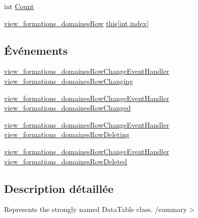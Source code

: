 \begin{DoxyCompactItemize}
\item 
int \hyperlink{classforma_1_1formadb_data_set_1_1view__formations__domaines_data_table_ae6dece4888a8569a5f2888d2f34e77d6}{Count}
\item 
\hyperlink{classforma_1_1formadb_data_set_1_1view__formations__domaines_row}{view\+\_\+formations\+\_\+domaines\+Row} \hyperlink{classforma_1_1formadb_data_set_1_1view__formations__domaines_data_table_a0643bff7069aed02800690faeedf0229}{this\mbox{[}int index\mbox{]}}
\end{DoxyCompactItemize}
\subsection*{Événements}
\begin{DoxyCompactItemize}
\item 
\hyperlink{classforma_1_1formadb_data_set_afcbb910689f00b10eff440c0637f5885}{view\+\_\+formations\+\_\+domaines\+Row\+Change\+Event\+Handler} \hyperlink{classforma_1_1formadb_data_set_1_1view__formations__domaines_data_table_a017522e40abc63ec9f9ddc257300e795}{view\+\_\+formations\+\_\+domaines\+Row\+Changing}
\item 
\hyperlink{classforma_1_1formadb_data_set_afcbb910689f00b10eff440c0637f5885}{view\+\_\+formations\+\_\+domaines\+Row\+Change\+Event\+Handler} \hyperlink{classforma_1_1formadb_data_set_1_1view__formations__domaines_data_table_a823ec6ff8bcc1f3db301067bbfa6b3ed}{view\+\_\+formations\+\_\+domaines\+Row\+Changed}
\item 
\hyperlink{classforma_1_1formadb_data_set_afcbb910689f00b10eff440c0637f5885}{view\+\_\+formations\+\_\+domaines\+Row\+Change\+Event\+Handler} \hyperlink{classforma_1_1formadb_data_set_1_1view__formations__domaines_data_table_ad59e65c5eb32203536abc3aca6e9eca9}{view\+\_\+formations\+\_\+domaines\+Row\+Deleting}
\item 
\hyperlink{classforma_1_1formadb_data_set_afcbb910689f00b10eff440c0637f5885}{view\+\_\+formations\+\_\+domaines\+Row\+Change\+Event\+Handler} \hyperlink{classforma_1_1formadb_data_set_1_1view__formations__domaines_data_table_a9725d24a07ec5174fe54e237a9d420f6}{view\+\_\+formations\+\_\+domaines\+Row\+Deleted}
\end{DoxyCompactItemize}


\subsection{Description détaillée}
Represents the strongly named Data\+Table class. /summary$>$ 


